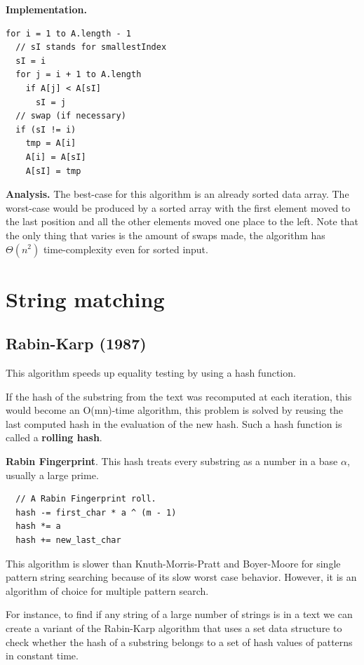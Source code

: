 \documentclass[oneside]{book} %
\theoremstyle{plain}
\begin{document}
\textbf{Implementation.}

\begin{lstlisting}
for i = 1 to A.length - 1
  // sI stands for smallestIndex
  sI = i
  for j = i + 1 to A.length
    if A[j] < A[sI]
      sI = j
  // swap (if necessary)
  if (sI != i)
    tmp = A[i]
    A[i] = A[sI]
    A[sI] = tmp
\end{lstlisting}

\textbf{Analysis.} The best-case for this algorithm is an already sorted data
array. The worst-case would be produced by a sorted array with the first element
moved to the last position and all the other elements moved one place to the
left. Note that the only thing that varies is the amount of swaps made, the
algorithm has \(\Theta(n^2)\) time-complexity even for sorted input.

\section{String matching}
\subsection{Rabin-Karp (1987)}
This algorithm speeds up equality testing by using a hash function.

If the hash of the substring from the text was recomputed at each iteration,
this would become an O(mn)-time algorithm, this problem is solved by reusing
the last computed hash in the evaluation of the new hash. Such a hash function
is called a \textbf{rolling hash}.

\textbf{Rabin Fingerprint}. This hash treats every substring as a number in a
base \(\alpha\), usually a large prime.

\begin{lstlisting}
  // A Rabin Fingerprint roll.
  hash -= first_char * a ^ (m - 1)
  hash *= a
  hash += new_last_char
\end{lstlisting}

This algorithm is slower than Knuth-Morris-Pratt and Boyer-Moore for single
pattern string searching because of its slow worst case behavior. However, it is
an algorithm of choice for multiple pattern search.

For instance, to find if any string of a large number of strings is in a text we
can create a variant of the Rabin-Karp algorithm that uses a set data structure
to check whether the hash of a substring belongs to a set of hash values of
patterns in constant time.
\end{document}
